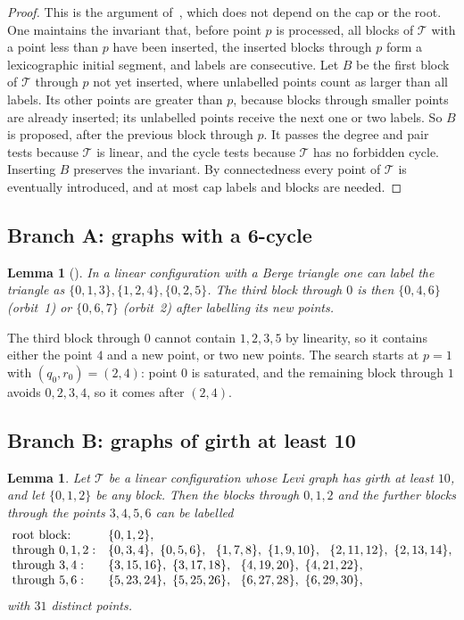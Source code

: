 \documentclass[11pt]{amsart}
\newtheorem{lemma}[theorem]{Lemma}
\theoremstyle{definition}
\theoremstyle{remark}
\begin{document}
\begin{proof}
This is the argument of~\cite[Prop.~10]{Tranquilli2026}, which does not depend on
the cap or the root. One maintains the invariant that, before point $p$ is
processed, all blocks of $\mathcal T$ with a point less than $p$ have been
inserted, the inserted blocks through $p$ form a lexicographic initial segment,
and labels are consecutive. Let $B$ be the first block of $\mathcal T$ through
$p$ not yet inserted, where unlabelled points count as larger than all labels.
Its other points are greater than $p$, because blocks through smaller points are
already inserted; its unlabelled points receive the next one or two labels. So
$B$ is proposed, after the previous block through $p$. It passes the degree and
pair tests because $\mathcal T$ is linear, and the cycle tests because
$\mathcal T$ has no forbidden cycle. Inserting $B$ preserves the invariant. By
connectedness every point of $\mathcal T$ is eventually introduced, and at most
$\mathrm{cap}$ labels and blocks are needed.
\end{proof}

\subsection{Branch A: graphs with a 6-cycle}\label{sec:branchA}

\begin{lemma}[{\cite[Lemma~9]{Tranquilli2026}}]\label{lem:triangle}
In a linear configuration with a Berge triangle one can label the triangle as
$\{0,1,3\},\{1,2,4\},\{0,2,5\}$. The third block through $0$ is then
$\{0,4,6\}$ (orbit~1) or $\{0,6,7\}$ (orbit~2) after labelling its new points.
\end{lemma}

The third block through $0$ cannot contain $1,2,3,5$ by linearity, so it
contains either the point $4$ and a new point, or two new points. The search
starts at $p=1$ with $(q_0,r_0)=(2,4)$: point $0$ is saturated, and the
remaining block through $1$ avoids $0,2,3,4$, so it comes after $(2,4)$.

\subsection{Branch B: graphs of girth at least 10}\label{sec:branchB}

\begin{lemma}\label{lem:moore-root}
Let $\mathcal T$ be a linear configuration whose Levi graph has girth at least
$10$, and let $\{0,1,2\}$ be any block. Then the blocks through $0,1,2$ and the
further blocks through the points $3,4,5,6$ can be labelled
\[
\begin{array}{@{}ll@{}}
\text{root block:} & \{0,1,2\},\\
\text{through } 0,1,2: & \{0,3,4\},\ \{0,5,6\},\ \ \{1,7,8\},\ \{1,9,10\},\ \ \{2,11,12\},\ \{2,13,14\},\\
\text{through } 3,4: & \{3,15,16\},\ \{3,17,18\},\ \ \{4,19,20\},\ \{4,21,22\},\\
\text{through } 5,6: & \{5,23,24\},\ \{5,25,26\},\ \ \{6,27,28\},\ \{6,29,30\},
\end{array}
\]
with $31$ distinct points.
\end{lemma}
\end{document}
